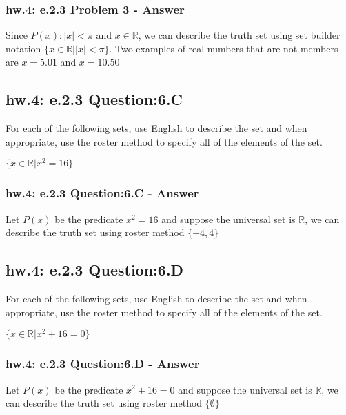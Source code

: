 \subsubsection*{hw.4: e.2.3 Problem 3 - Answer}

Since $P(x): |x|< \pi$ and $x \in \mathbb{R}$, we can describe the truth set using set builder notation $\{x \in \mathbb{R} | |x| < \pi \}$. Two examples of real numbers that are not members are $x = 5.01$ and $x= 10.50$ \\

\subsection{hw.4: e.2.3 Question:6.C}
For each of the following  sets, use English to describe the set and when appropriate, use the roster method to specify all of the elements of the set. 

\begin{center}
$\{x \in \mathbb{R} | x^2 = 16 \}$
\end{center} 

\subsubsection*{hw.4: e.2.3 Question:6.C - Answer}
Let $P(x)$ be the predicate $x^2 = 16$ and suppose the universal set is $\mathbb{R}$, we can describe the truth set using roster method $\{ -4, 4 \}$ \\


\subsection{hw.4: e.2.3 Question:6.D}
For each of the following  sets, use English to describe the set and when appropriate, use the roster method to specify all of the elements of the set. 

\begin{center}
$\{x \in \mathbb{R} | x^2 + 16 = 0 \}$
\end{center} 

\subsubsection*{hw.4: e.2.3 Question:6.D - Answer}
Let $P(x)$ be the predicate $x^2 + 16 = 0$ and suppose the universal set is $\mathbb{R}$, we can describe the truth set using roster method $\{ \emptyset \}$ \\





